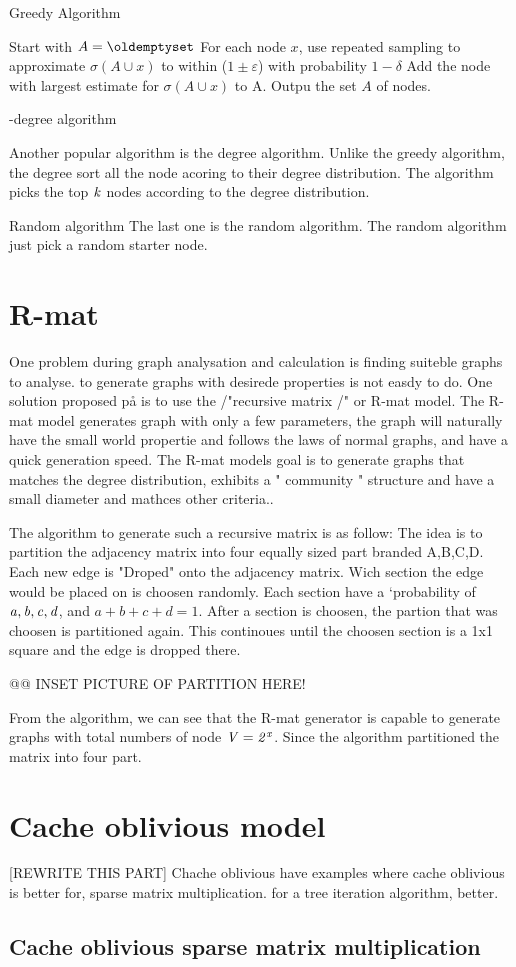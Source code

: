  \begin{algorithm}
\caption{Greedy Algorithm}
\begin{algorithmic}[1]
\State Start with $A = \oldemptyset$
\State For each node $x$, use repeated sampling to approximate $\sigma(A \cup {x}) $ to within ($1 \pm \varepsilon$) with probability
$1 − \delta$
\State Add the node with largest estimate for $\sigma(A \cup {x})$ to A.
\EndWhile
\State Outpu the set $A$ of nodes.
\end{algorithmic}
\end{algorithm}

-degree algorithm

Another popular algorithm is the degree algorithm. Unlike the greedy algorithm, the degree sort all the node acoring to their degree distribution. The algorithm picks the top $\it{k}$ nodes according to the degree distribution. 

Random algorithm
The last one is the random algorithm. The random algorithm just pick a random starter node. 

\section{R-mat}
One problem during graph analysation and calculation is finding suiteble graphs to analyse. to generate graphs with desirede properties is not easdy to do. One solution proposed på \cite{RMat2004} is to use the /"recursive matrix /" or R-mat model. The R-mat model generates graph with only a few parameters, the graph will naturally have the small world propertie and follows the laws of normal graphs, and have a quick generation speed. The R-mat models goal is to generate graphs that matches the degree distribution, exhibits a " community " structure and have a small diameter and mathces other criteria.\cite{Rmat2004}.

The algorithm to generate such a recursive matrix is as follow: The idea is to partition the adjacency matrix into four equally sized part branded A,B,C,D. Each new edge is "Droped" onto the adjacency matrix. Wich section the edge would be placed on is choosen randomly. Each section have a `probability of $\it{a, b, c, d}$, and $a + b + c + d = 1$. After a section is choosen, the partion that was choosen is partitioned again. This continoues until the choosen section is a 1x1 square and the edge is dropped there. 

@@
INSET PICTURE OF PARTITION HERE!

From the algorithm, we can see that the R-mat generator is capable to generate graphs with total numbers of node $ \it{V} = 2^x$. Since the algorithm partitioned the matrix into four part. 

\section{Cache oblivious model} 
[REWRITE THIS PART]
Chache oblivious
have examples where cache oblivious is better for, sparse matrix multiplication.
for a tree iteration algorithm, better. 

\subsection{Cache oblivious sparse matrix multiplication}
